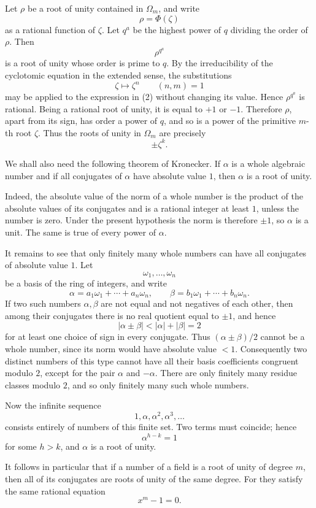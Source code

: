 \documentclass[11pt,a4paper]{book}
\begin{document}
Let \(\rho\) be a root of unity contained in \(\Omega_m\), and write
\[
  \rho=\Phi(\zeta)
\tag{1}
\]
as a rational function of \(\zeta\).  Let \(q^a\) be the highest power of \(q\) dividing the order of \(\rho\).  Then
\[
  \rho^{q^a}
\tag{2}
\]
is a root of unity whose order is prime to \(q\).  By the irreducibility of the cyclotomic equation in the extended sense, the substitutions
\[
  \zeta\mapsto\zeta^n\qquad (n,m)=1
\]
may be applied to the expression in (2) without changing its value.  Hence \(\rho^{q^a}\) is rational.  Being a rational root of unity, it is equal to \(+1\) or \(-1\).  Therefore \(\rho\), apart from its sign, has order a power of \(q\), and so is a power of the primitive \(m\)-th root \(\zeta\).  Thus the roots of unity in \(\Omega_m\) are precisely
\[
  \pm \zeta^k.
\tag{3}
\]

We shall also need the following theorem of Kronecker.  If \(\alpha\) is a whole algebraic number and if all conjugates of \(\alpha\) have absolute value \(1\), then \(\alpha\) is a root of unity.

Indeed, the absolute value of the norm of a whole number is the product of the absolute values of its conjugates and is a rational integer at least \(1\), unless the number is zero.  Under the present hypothesis the norm is therefore \(\pm1\), so \(\alpha\) is a unit.  The same is true of every power of \(\alpha\).

It remains to see that only finitely many whole numbers can have all conjugates of absolute value \(1\).  Let
\[
  \omega_1,\ldots,\omega_n
\]
be a basis of the ring of integers, and write
\[
  \alpha=a_1\omega_1+\cdots+a_n\omega_n,\qquad
  \beta=b_1\omega_1+\cdots+b_n\omega_n.
\]
If two such numbers \(\alpha,\beta\) are not equal and not negatives of each other, then among their conjugates there is no real quotient equal to \(\pm1\), and hence
\[
  |\alpha\pm\beta|<|\alpha|+|\beta|=2
\]
for at least one choice of sign in every conjugate.  Thus \((\alpha\pm\beta)/2\) cannot be a whole number, since its norm would have absolute value \(<1\).  Consequently two distinct numbers of this type cannot have all their basis coefficients congruent modulo \(2\), except for the pair \(\alpha\) and \(-\alpha\).  There are only finitely many residue classes modulo \(2\), and so only finitely many such whole numbers.

Now the infinite sequence
\[
  1,\alpha,\alpha^2,\alpha^3,\ldots
\]
consists entirely of numbers of this finite set.  Two terms must coincide; hence
\[
  \alpha^{h-k}=1
\]
for some \(h>k\), and \(\alpha\) is a root of unity.

It follows in particular that if a number of a field is a root of unity of degree \(m\), then all of its conjugates are roots of unity of the same degree.  For they satisfy the same rational equation
\[
  x^m-1=0.
\]
\end{document}
